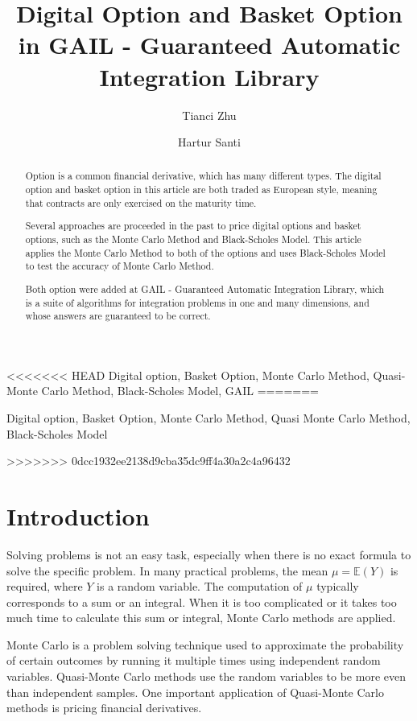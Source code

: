 \documentclass[]{elsarticle}
\theoremstyle{definition}
\theoremstyle{remark}
\begin{document}
\begin{frontmatter}
\title{Digital Option and Basket Option in GAIL - Guaranteed Automatic Integration Library}
\author{Tianci Zhu}
\author{Hartur Santi}
\address{Department of Applied Mathematics, Illinois Institute of Technology, Illinois, USA}

\begin{abstract}

Option is a common financial derivative, which has many different types. The digital option and basket option in this article are both traded as European style, meaning that contracts are only exercised on the maturity time.

Several approaches are proceeded in the past to price digital options and basket options, such as the Monte Carlo Method and Black-Scholes Model. This article applies the Monte Carlo Method to both of the options and uses Black-Scholes Model to test the accuracy of Monte Carlo Method.

Both option were added at GAIL - Guaranteed Automatic Integration Library, which is a suite of algorithms for integration problems in one and many dimensions, and whose answers are guaranteed to be correct.

\end{abstract}

\begin{keyword}
<<<<<<< HEAD
Digital option, Basket Option, Monte Carlo Method, Quasi-Monte Carlo Method, Black-Scholes Model, GAIL
=======

Digital option, Basket Option, Monte Carlo Method, Quasi Monte Carlo Method, Black-Scholes Model

>>>>>>> 0dcc1932ee2138d9cba35dc9ff4a30a2c4a96432
\end{keyword}
\end{frontmatter}

\section{Introduction}

Solving problems is not an easy task, especially when there is no exact formula to solve the specific problem. In many practical problems, the mean $\mu=\mathbb{E}(Y)$ is required, where $Y$ is a random variable. The computation of $\mu$ typically corresponds to a sum or an integral. When it is too complicated or it takes too much time to calculate this sum or integral, Monte Carlo methods are applied.

Monte Carlo is a problem solving technique used to approximate the probability of certain outcomes by running it multiple times using independent random variables. Quasi-Monte Carlo methods use the random variables to be more even than independent samples. One important application of Quasi-Monte Carlo methods is pricing financial derivatives.
\end{document}
